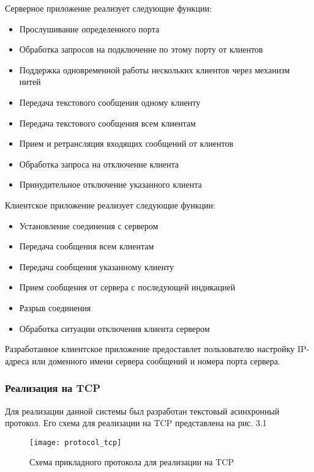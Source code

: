 Серверное приложение реализует следующие функции:
\begin{itemize}
\item Прослушивание определенного порта
\item Обработка запросов на подключение по этому порту от клиентов
\item Поддержка одновременной работы нескольких клиентов через механизм нитей
\item Передача текстового сообщения одному клиенту
\item Передача текстового сообщения всем клиентам
\item Прием и ретрансляция входящих сообщений от клиентов
\item Обработка запроса на отключение клиента
\item Принудительное отключение указанного клиента
\end{itemize}

Клиентское приложение реализует следующие функции:

\begin{itemize}
\item Установление соединения с сервером
\item Передача сообщения всем клиентам
\item Передача сообщения указанному клиенту
\item Прием сообщения от сервера с последующей индикацией
\item Разрыв соединения
\item Обработка ситуации отключения клиента сервером
\end{itemize}

Разработанное клиентское приложение предоставлет пользователю настройку IP-адреса или доменного имени сервера сообщений и номера порта сервера.

\subsubsection{Реализация на TCP}

Для реализации данной системы был разработан текстовый асинхронный протокол. Его схема для реализации на TCP представлена на рис. 3.1

\begin{figure}[H]
	\begin{center}
		\texttt{[image: protocol\_tcp]}
		\caption{Схема прикладного протокола для реализации на TCP} 
		\label{pic:pic_name} %
	\end{center}
\end{figure}

